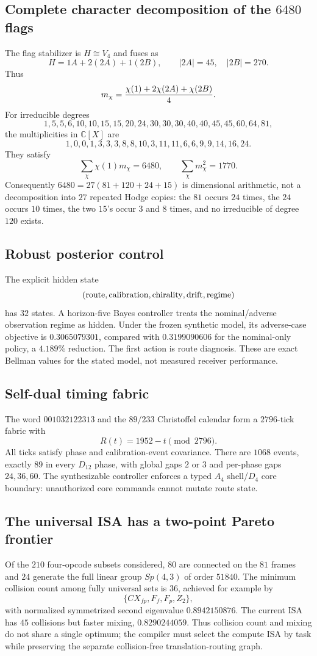 \subsection{Complete character decomposition of the $6480$ flags}
The flag stabilizer is $H\cong V_4$ and fuses as
\[
 H=1A+2(2A)+1(2B),\qquad |2A|=45,\quad |2B|=270.
\]
Thus
\[
 m_\chi={\chi(1)+2\chi(2A)+\chi(2B)\over4}.
\]
For irreducible degrees
\[
1,5,5,6,10,10,15,15,20,24,30,30,30,40,40,45,45,60,64,81,
\]
the multiplicities in $\mathbb C[X]$ are
\[
1,0,0,1,3,3,3,8,8,10,3,11,11,6,6,9,9,14,16,24.
\]
They satisfy
\[
 \sum_\chi \chi(1)m_\chi=6480,
 \qquad
 \sum_\chi m_\chi^2=1770.
\]
Consequently $6480=27(81+120+24+15)$ is dimensional arithmetic, not a decomposition into
$27$ repeated Hodge copies: the $81$ occurs $24$ times, the $24$ occurs $10$ times, the two
$15$'s occur $3$ and $8$ times, and no irreducible of degree $120$ exists.

\subsection{Robust posterior control}
The explicit hidden state
\[
({\rm route},{\rm calibration},{\rm chirality},{\rm drift},{\rm regime})
\]
has $32$ states.  A horizon-five Bayes controller treats the nominal/adverse observation
regime as hidden.  Under the frozen synthetic model, its adverse-case objective is
$0.3065079301$, compared with $0.3199090606$ for the nominal-only policy, a $4.189\%$
reduction.  The first action is route diagnosis.  These are exact Bellman values for the
stated model, not measured receiver performance.

\subsection{Self-dual timing fabric}
The word $001032122313$ and the $89/233$ Christoffel calendar form a $2796$-tick fabric with
\[
 R(t)=1952-t\pmod{2796}.
\]
All ticks satisfy phase and calibration-event covariance.  There are $1068$ events, exactly
$89$ in every $D_{12}$ phase, with global gaps $2$ or $3$ and per-phase gaps $24,36,60$.
The synthesizable controller enforces a typed $A_4$ shell/$D_4$ core boundary: unauthorized
core commands cannot mutate route state.

\subsection{The universal ISA has a two-point Pareto frontier}
Of the $210$ four-opcode subsets considered, $80$ are connected on the $81$ frames and $24$
generate the full linear group $Sp(4,3)$ of order $51840$.  The minimum collision count
among fully universal sets is $36$, achieved for example by
\[
\{CX_{fp},F_f,F_p,Z_2\},
\]
with normalized symmetrized second eigenvalue $0.8942150876$.  The current ISA has $45$
collisions but faster mixing, $0.8290244059$.  Thus collision count and mixing do not share
a single optimum; the compiler must select the compute ISA by task while preserving the
separate collision-free translation-routing graph.

